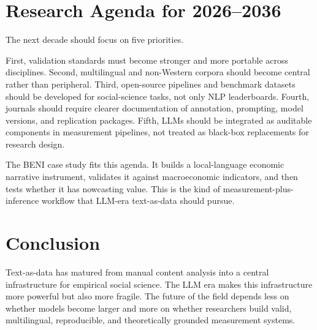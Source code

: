 \documentclass[11pt]{article}
\begin{document}
\section{Research Agenda for 2026--2036}

The next decade should focus on five priorities.

First, validation standards must become stronger and more portable across disciplines. Second, multilingual and non-Western corpora should become central rather than peripheral. Third, open-source pipelines and benchmark datasets should be developed for social-science tasks, not only NLP leaderboards. Fourth, journals should require clearer documentation of annotation, prompting, model versions, and replication packages. Fifth, LLMs should be integrated as auditable components in measurement pipelines, not treated as black-box replacements for research design.

The BENI case study fits this agenda. It builds a local-language economic narrative instrument, validates it against macroeconomic indicators, and then tests whether it has nowcasting value. This is the kind of measurement-plus-inference workflow that LLM-era text-as-data should pursue.

\section{Conclusion}

Text-as-data has matured from manual content analysis into a central infrastructure for empirical social science. The LLM era makes this infrastructure more powerful but also more fragile. The future of the field depends less on whether models become larger and more on whether researchers build valid, multilingual, reproducible, and theoretically grounded measurement systems.
\end{document}
